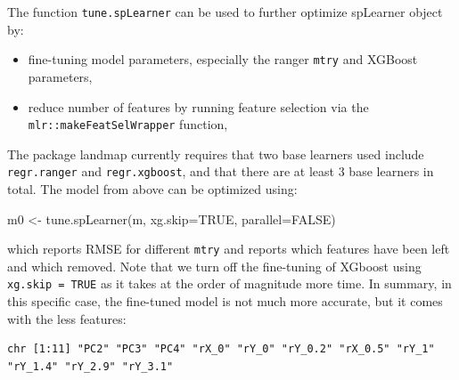 \documentclass[
  graybox,natbib,nospthms]{svmono}
\newenvironment{Shaded}{\begin{snugshade}}{\end{snugshade}}
\newcommand{\AttributeTok}[1]{\textcolor[rgb]{0.61,0.61,0.61}{#1}}
\newcommand{\ConstantTok}[1]{\textcolor[rgb]{0,0,0}{#1}}
\newcommand{\FunctionTok}[1]{\textcolor[rgb]{0,0,0}{#1}}
\newcommand{\NormalTok}[1]{#1}
\newcommand{\OtherTok}[1]{\textcolor[rgb]{0.37,0.37,0.37}{#1}}
\newcommand{\SpecialCharTok}[1]{\textcolor[rgb]{0,0,0}{#1}}
\providecommand{\tightlist}{%
  \setlength{\itemsep}{0pt}\setlength{\parskip}{0pt}}
\providecommand{\tightlist}{\setlength{\itemsep}{0pt}\setlength{\parskip}{0pt}}
\begin{document}
The function \texttt{tune.spLearner} can be used to further optimize spLearner object by:

\begin{itemize}
\tightlist
\item
  fine-tuning model parameters, especially the ranger \texttt{mtry} and XGBoost parameters,\\
\item
  reduce number of features by running feature selection via the \texttt{mlr::makeFeatSelWrapper} function,
\end{itemize}

The package landmap currently requires that two base learners used include \texttt{regr.ranger} and
\texttt{regr.xgboost}, and that there are at least 3 base learners in total. The model from above can be optimized using:

\begin{Shaded}
\begin{Highlighting}[]
\NormalTok{m0 }\OtherTok{\textless{}{-}} \FunctionTok{tune.spLearner}\NormalTok{(m, }\AttributeTok{xg.skip=}\ConstantTok{TRUE}\NormalTok{, }\AttributeTok{parallel=}\ConstantTok{FALSE}\NormalTok{)}
\end{Highlighting}
\end{Shaded}

which reports RMSE for different \texttt{mtry} and reports which features have been left and which removed. Note that we turn off the fine-tuning of XGboost using \texttt{xg.skip\ =\ TRUE} as it takes at the order of magnitude more time. In summary, in this specific case, the fine-tuned model is not much more accurate, but it comes with the less features:

\begin{Shaded}
\end{Shaded}

\begin{verbatim}
chr [1:11] "PC2" "PC3" "PC4" "rX_0" "rY_0" "rY_0.2" "rX_0.5" "rY_1" "rY_1.4" "rY_2.9" "rY_3.1"
\end{verbatim}

\begin{Shaded}
\end{Shaded}
\end{document}
